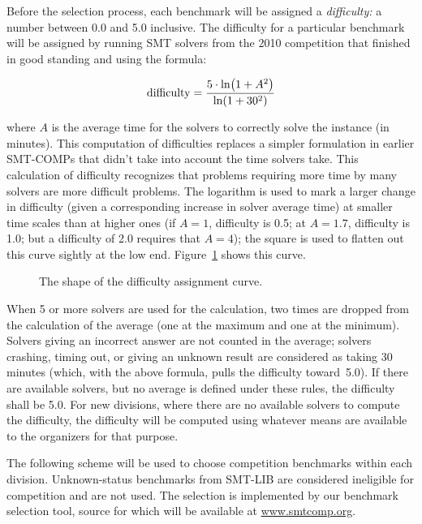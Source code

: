 \documentclass[12pt]{article}
\begin{document}
Before the selection process, each benchmark will be assigned a
\emph{difficulty:} a number between 0.0 and 5.0 inclusive.  The
difficulty for a particular benchmark will be assigned by running SMT
solvers from the 2010 competition that finished in good
standing and using the formula:

\[\mathrm{difficulty} = {5\cdot\ln\!\left(1+A^2\right) \over \ln\!\left(1+30^2\right)}\]

\noindent
where $A$ is the average time for the solvers to correctly solve the
instance (in minutes).  This computation of difficulties
replaces a simpler formulation in earlier SMT-COMPs that didn't take
into account the time solvers take.  This calculation of difficulty
recognizes that problems requiring more time by many solvers are
more difficult problems.  The logarithm is used to
mark a larger change in difficulty (given a corresponding increase in
solver average time) at smaller time scales than at higher ones (if $A=1$,
difficulty is 0.5; at $A=1.7$, difficulty is 1.0; but a difficulty of 2.0
requires that $A=4$); the square is used to flatten out this curve sightly
at the low end.  Figure~\ref{difficultyplot} shows this curve.

\begin{figure}
  \centerline{}
  \caption{The shape of the difficulty assignment curve.}
  \label{difficultyplot}
\end{figure}

When 5 or more solvers are used for the
calculation, two times are dropped from the calculation of the average
(one at the maximum and one at the minimum).  Solvers giving an
incorrect answer are not counted in the average; solvers crashing,
timing out, or giving an unknown result are considered as taking 30
minutes (which, with the above formula, pulls the difficulty
toward~5.0).  If there are available solvers, but no average is
defined under these rules, the difficulty shall be 5.0.  For new
divisions, where there are no available solvers to compute the
difficulty, the difficulty will be computed using whatever means are
available to the organizers for that purpose.

The following scheme will be used to choose competition benchmarks
within each division.  Unknown-status benchmarks from SMT-LIB are
considered ineligible for competition and are not used.
%
The selection
is implemented by our benchmark selection tool, source for which will
be available at \url{www.smtcomp.org}.
\end{document}

